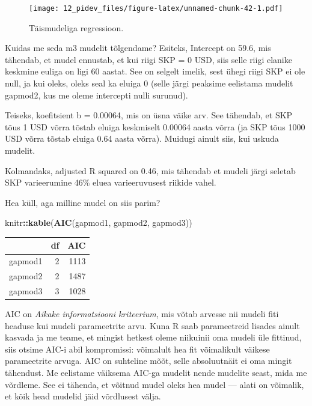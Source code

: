 \documentclass[]{book}
\newenvironment{Shaded}{\begin{snugshade}}{\end{snugshade}}
\newcommand{\KeywordTok}[1]{\textcolor[rgb]{0.13,0.29,0.53}{\textbf{#1}}}
\newcommand{\NormalTok}[1]{#1}
\newcommand{\OperatorTok}[1]{\textcolor[rgb]{0.81,0.36,0.00}{\textbf{#1}}}
\begin{document}
\begin{figure}
\centering
\texttt{[image: 12\_pidev\_files/figure-latex/unnamed-chunk-42-1.pdf]}
\caption{\label{fig:unnamed-chunk-42}Täismudeliga regressioon.}
\end{figure}

Kuidas me seda m3 mudelit tõlgendame?
Esiteks, Intercept on 59.6, mis tähendab, et mudel ennustab, et kui riigi SKP = 0 USD, siis selle riigi elanike keskmine euliga on ligi 60 aastat.
See on selgelt imelik, sest ühegi riigi SKP ei ole null, ja kui oleks, oleks seal ka eluiga 0 (selle järgi peaksime eelistama mudelit gapmod2, kus me oleme intercepti nulli surunud).

Teiseks, koefitsient b = 0.00064, mis on üsna väike arv. See tähendab, et SKP tõus 1 USD võrra tõstab eluiga keskmiselt 0.00064 aasta võrra (ja SKP tõus 1000 USD võrra tõstab eluiga 0.64 aasta võrra).
Muidugi ainult siis, kui uskuda mudelit.

Kolmandaks, adjusted R squared on 0.46, mis tähendab et mudeli järgi seletab SKP varieerumine 46\% eluea varieeruvusest riikide vahel.

Hea küll, aga milline mudel on siis parim?

\begin{Shaded}
\begin{Highlighting}[]
\NormalTok{knitr}\OperatorTok{::}\KeywordTok{kable}\NormalTok{(}\KeywordTok{AIC}\NormalTok{(gapmod1, gapmod2, gapmod3))}
\end{Highlighting}
\end{Shaded}

\begin{tabular}{l|r|r}
\hline
  & df & AIC\\
\hline
gapmod1 & 2 & 1113\\
\hline
gapmod2 & 2 & 1487\\
\hline
gapmod3 & 3 & 1028\\
\hline
\end{tabular}

AIC on \emph{Aikake informatsiooni kriteerium}, mis võtab arvesse nii mudeli fiti headuse kui mudeli parameetrite arvu.
Kuna R saab parameetreid lisades ainult kasvada ja me teame, et mingist hetkest oleme niikuinii oma mudeli üle fittinud, siis otsime AIC-i abil kompromissi: võimalult hea fit võimalikult väikese parameetrite arvuga.
AIC on suhteline mõõt, selle absoluutnäit ei oma mingit tähendust.
Me eelistame väiksema AIC-ga mudelit nende mudelite seast, mida me võrdleme.
See ei tähenda, et võitnud mudel oleks hea mudel --- alati on võimalik, et kõik head mudelid jäid võrdlusest välja.
\end{document}
